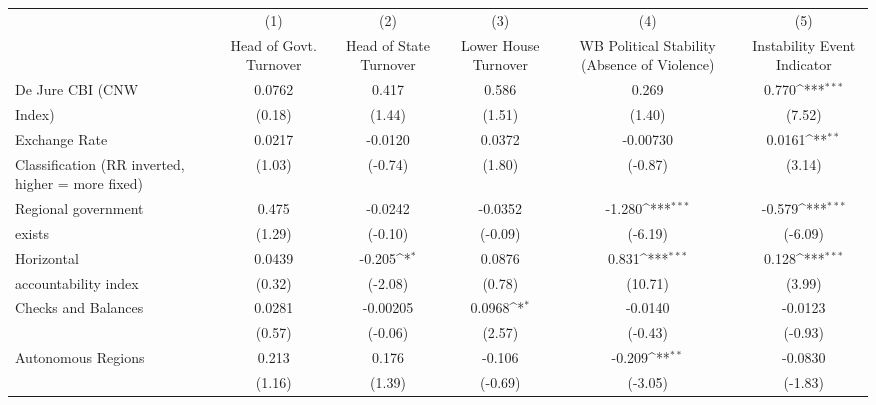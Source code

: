 {
\def\sym#1{\ifmmode^{#1}\else\(^{#1}\)\fi}
\begin{tabular}{l*{5}{c}}
\hline\hline
                    &\multicolumn{1}{c}{(1)}&\multicolumn{1}{c}{(2)}&\multicolumn{1}{c}{(3)}&\multicolumn{1}{c}{(4)}&\multicolumn{1}{c}{(5)}\\
                    &\multicolumn{1}{c}{Head of Govt. Turnover}&\multicolumn{1}{c}{Head of State Turnover}&\multicolumn{1}{c}{Lower House Turnover}&\multicolumn{1}{c}{WB Political Stability (Absence of Violence)}&\multicolumn{1}{c}{Instability Event Indicator}\\
\hline
De Jure CBI (CNW    &      0.0762         &       0.417         &       0.586         &       0.269         &       0.770\sym{***}\\
Index)              &      (0.18)         &      (1.44)         &      (1.51)         &      (1.40)         &      (7.52)         \\
[1em]
Exchange Rate       &      0.0217         &     -0.0120         &      0.0372         &    -0.00730         &      0.0161\sym{**} \\
Classification (RR inverted, higher = more fixed)&      (1.03)         &     (-0.74)         &      (1.80)         &     (-0.87)         &      (3.14)         \\
[1em]
Regional government &       0.475         &     -0.0242         &     -0.0352         &      -1.280\sym{***}&      -0.579\sym{***}\\
exists              &      (1.29)         &     (-0.10)         &     (-0.09)         &     (-6.19)         &     (-6.09)         \\
[1em]
Horizontal          &      0.0439         &      -0.205\sym{*}  &      0.0876         &       0.831\sym{***}&       0.128\sym{***}\\
accountability index&      (0.32)         &     (-2.08)         &      (0.78)         &     (10.71)         &      (3.99)         \\
[1em]
Checks and Balances &      0.0281         &    -0.00205         &      0.0968\sym{*}  &     -0.0140         &     -0.0123         \\
                    &      (0.57)         &     (-0.06)         &      (2.57)         &     (-0.43)         &     (-0.93)         \\
[1em]
Autonomous Regions  &       0.213         &       0.176         &      -0.106         &      -0.209\sym{**} &     -0.0830         \\
                    &      (1.16)         &      (1.39)         &     (-0.69)         &     (-3.05)         &     (-1.83)         \\

\end{tabular}}
